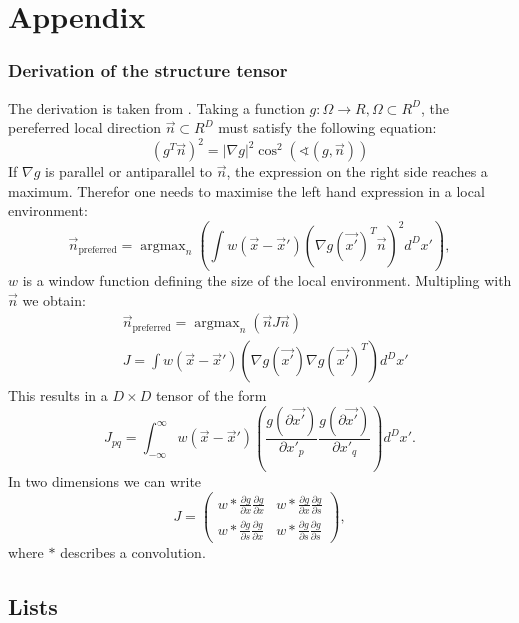 \documentclass  [
  paper    = a4,
  BCOR     = 10mm,
  twoside,
  fontsize = 12pt,
  fleqn,
  toc      = bibnumbered,
  toc      = listofnumbered,
  numbers  = noendperiod,
  headings = normal,
  listof   = leveldown,
  version  = 3.03
]                                       {scrreprt}
\DeclareMathOperator*{\argmax}{argmax}
\begin{document}
  \part{Appendix}
  \begin{appendix}
  	\section{Derivation of the structure tensor}
  	The derivation is taken from \cite{jahne2013digitale}. Taking a function $g:\Omega\rightarrow \!R, \Omega \subset \!R^D$, the pereferred local direction $\vec{n} \subset \!R^D$ must satisfy the following equation:
  	\begin{equation}\label{key}
  	( g^T\vec{n})^2 = |\nabla g |^2 \cos^2(\sphericalangle (g, \vec{n}))
  	\end{equation}
  	If $\nabla g$ is parallel or antiparallel to $\vec{n}$, the expression on the right side reaches a maximum. Therefor one needs to maximise the left hand expression in a local environment:
  	\begin{equation}\label{key}
  	\vec n_\text{preferred} = \argmax_n\left(\int w(\vec x - \vec x')\left(\nabla g(\vec{x'})^T \vec{n}\right)^2d^Dx' \right),
  	\end{equation}
  	$w$ is a window function defining the size of the local environment. Multipling with $\vec{n}$
  	we obtain:
  	\begin{align}\label{key}
  	&\vec n_\text{preferred} = \argmax_n\left(\vec n  J \vec n \right)\\
  	& J = \int w(\vec x - \vec x')\left(\nabla g(\vec{x'}) \nabla g(\vec{x'})^T\right)d^Dx'
  	\end{align}
  	This results in a $D\times D $ tensor of the form
  	\begin{equation}\label{key}
  	J_{pq} = \int_{-\infty}^{\infty} w(\vec x - \vec x')\left(\frac{g(\partial\vec{x'})}{\partial x'_p} \frac{g(\partial\vec{x'})}{\partial x'_q}\right)d^Dx'.
  	\end{equation}
  	In two dimensions we can write
	\begin{equation}\label{key}
	J =\left(
	\begin{matrix}
	w*\frac{\partial g}{\partial x}\frac{\partial g}{\partial x} & w*\frac{\partial g}{\partial x}\frac{\partial g}{\partial s} \\
	w*\frac{\partial g}{\partial s}\frac{\partial g}{\partial x} & w*\frac{\partial g}{\partial s}\frac{\partial g}{\partial s} 
	\end{matrix}\right),
	\end{equation}  
	where \glqq $*$ \grqq describes a convolution.	
  	
  	
    \chapter{Lists}
    \listoffigures
    \listoftables
    {}
    
    
  \end{appendix}
\end{document}
